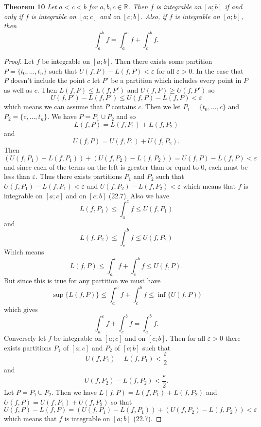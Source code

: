 \documentclass{article}
\begin{document}
\begin{flushleft}
\textbf{Theorem 10}
\textsl{Let $a<c<b$ for $a,b,c \in \mathbb{R}$. Then $f$ is integrable on $[a;b]$ if and only if $f$ is integrable on $[a;c]$ and on $[c;b]$. Also, if $f$ is integrable on $[a;b]$, then
\[
\int_a^b f = \int_a^c f + \int_c^b f.
\]}
\begin{proof}
Let $f$ be integrable on $[a;b]$. Then there exists some partition $P = \{t_0, \dots , t_n\}$ such that $U(f,P)-L(f,P) < \varepsilon$ for all $\varepsilon > 0$. In the case that $P$ doesn't include the point $c$ let $P'$ be a partition which includes every point in $P$ as well as $c$. Then $L(f,P) \leq L(f,P')$ and $U(f,P) \geq U(f,P')$ so
\[
U(f,P')-L(f,P') \leq U(f,P) - L(f,P) < \varepsilon
\]
which means we can assume that $P$ contains $c$. Then we let $P_1 = \{t_0, \dots , c\}$ and $P_2 = \{c, \dots , t_n\}$. We have $P = P_1 \cup P_2$ and so
\[
L(f,P) = L(f,P_1) + L(f,P_2)
\]
and
\[
U(f,P) = U(f,P_1) + U(f,P_2).
\]
Then
\[
(U(f,P_1)-L(f,P_1)) + (U(f,P_2) - L(f,P_2)) = U(f,P) - L(f,P) < \varepsilon
\]
and since each of the terms on the left is greater than or equal to $0$, each must be less than $\varepsilon$. Thus there exists partitions $P_1$ and $P_2$ such that $U(f,P_1)-L(f,P_1) < \varepsilon$ and $U(f,P_2) - L(f,P_2) < \varepsilon$ which means that $f$ is integrable on $[a;c]$ and on $[c;b]$ (22.7). Also we have
\[
L(f,P_1) \leq \int_a^c f \leq U(f,P_1)
\]
and
\[
L(f,P_2) \leq \int_c^b f \leq U(f,P_2)
\]
Which means
\[
L(f,P) \leq \int_a^c f + \int_c^b f \leq U(f,P).
\]
But since this is true for any partition we must have
\[
\sup \{L(f,P)\} \leq \int_a^c f + \int_c^b f \leq \inf \{U(f,P)\}
\]
which gives
\[
\int_a^c f + \int_c^b f = \int_a^b f.
\]
Conversely let $f$ be integrable on $[a;c]$ and on $[c;b]$. Then for all $\varepsilon > 0$ there exists partitions $P_1$ of $[a;c]$ and $P_2$ of $[c;b]$ such that
\[
U(f,P_1) - L(f,P_1) < \frac{\varepsilon}{2}
\]
and
\[
U(f,P_2) - L(f,P_2) < \frac{\varepsilon}{2}.
\]
Let $P = P_1 \cup P_2$. Then we have $L(f,P) = L(f,P_1) + L(f,P_2)$ and $U(f,P) = U(f,P_1) + U(f,P_2)$ so that
\[
U(f,P) - L(f,P) = (U(f,P_1) - L(f,P_1)) + (U(f,P_2) - L(f,P_2)) < \varepsilon
\]
which means that $f$ is integrable on $[a;b]$ (22.7).
\end{proof}


\end{flushleft}
\end{document}
